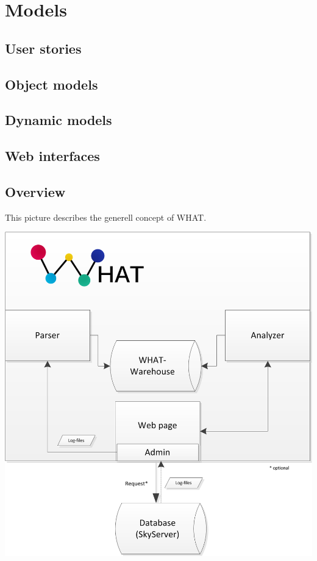 \section{Models}

\subsection{User stories}

\subsection{Object models}

\subsection{Dynamic models}

\subsection{Web interfaces}

\newpage
\subsection{Overview}
This picture describes the generell concept of WHAT.
\begin{center}
\includegraphics[width=1\linewidth]{Pictures/GenerellConcept.png}
\end{center} 

